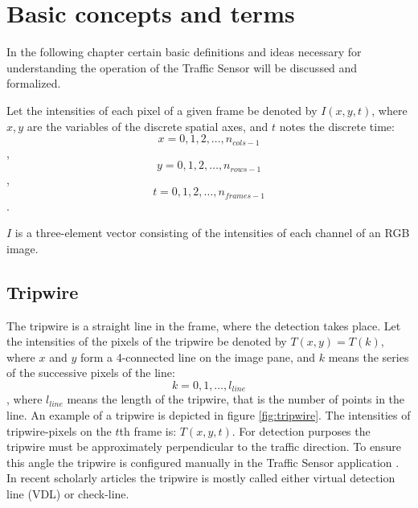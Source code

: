 \chapter{Basic concepts and terms}\label{chap:Concepts}
In the following chapter certain basic definitions and ideas necessary for understanding the operation of the Traffic Sensor will be discussed and formalized.

Let the intensities of each pixel of a given frame be denoted by $I(x,y,t)$, where $x, y$ are the variables of the discrete spatial axes, and $t$ notes the discrete time:
\begin{displaymath}
x=0,1,2,\dotsc,n_{cols-1}
\end{displaymath} 
,
\begin{displaymath}
y=0,1,2,\dotsc,n_{rows-1}
\end{displaymath}
,
\begin{displaymath}
t=0,1,2,\dotsc,n_{frames-1}
\end{displaymath}.

$I$ is a three-element vector consisting of the intensities of each channel of an RGB image.

\section{Tripwire}
The tripwire is a straight line in the frame, where the detection takes place.
Let the intensities of the pixels of the tripwire be denoted by $T(x,y)=T(k)$, where $x$ and $y$ form a 4-connected line on the image pane, and $k$ means the series of the successive pixels of the line:
\begin{displaymath}
	k=0,1,\dotsc,l_{line}
\end{displaymath},
where $l_{line}$ means the length of the tripwire, that is the number of points in the line.
An example of a tripwire is depicted in figure \ref{fig:tripwire}.
The intensities of tripwire-pixels on the $t$th frame is: $T(x,y,t)$.
For detection purposes the tripwire must be approximately perpendicular to the traffic direction.
To ensure this angle the tripwire is configured manually in the Traffic Sensor application .
In recent scholarly articles the tripwire is mostly called either virtual detection line (VDL) or check-line.
